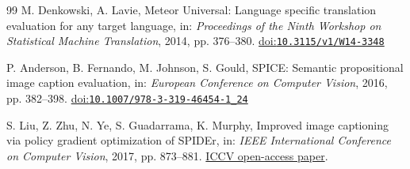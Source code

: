 \documentclass[a4paper,fleqn]{cas-dc}
\providecommand{\doi}[1]{%
  \href{https://doi.org/#1}{doi:\nolinkurl{#1}}}
\begin{document}
\begin{thebibliography}{99}
M. Denkowski, A. Lavie,
Meteor Universal: Language specific translation evaluation
for any target language,
in: \emph{Proceedings of the Ninth Workshop on Statistical
Machine Translation}, 2014, pp. 376--380.
\doi{10.3115/v1/W14-3348}


P. Anderson, B. Fernando, M. Johnson, S. Gould,
SPICE: Semantic propositional image caption evaluation,
in: \emph{European Conference on Computer Vision}, 2016, pp. 382--398.
\doi{10.1007/978-3-319-46454-1_24}


S. Liu, Z. Zhu, N. Ye, S. Guadarrama, K. Murphy,
Improved image captioning via policy gradient optimization of SPIDEr,
in: \emph{IEEE International Conference on Computer Vision},
2017, pp. 873--881.
\href{https://openaccess.thecvf.com/content_iccv_2017/html/Liu_Improved_Image_Captioning_ICCV_2017_paper.html}
{ICCV open-access paper}.


\end{thebibliography}

\endgroup
\end{document}
